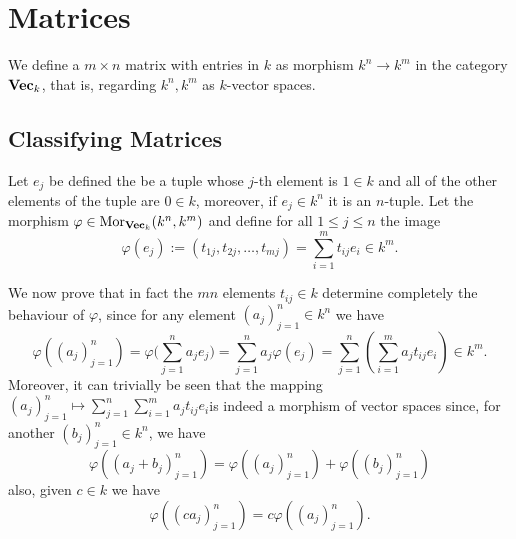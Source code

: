 \section{Matrices}

\begin{definition}[Matrix]
   We define a \(m \times n\) matrix with entries in \(k\) as morphism \(k^n \to
   k^m\) in the category \({\textbf{Vec}}_k\), that is, regarding \(k^n, k^m\) as
   \(k\)-vector spaces.
\end{definition}

\subsection{Classifying Matrices}

Let \(e_j\) be defined the be a tuple whose \(j\)-th element is \(1 \in k\) and
all of the other elements of the tuple are \(0 \in k\), moreover, if \(e_j \in
k^n\) it is an \(n\)-tuple. Let the morphism \(\varphi \in \operatorname{Mor}_{{\textbf{Vec}}_k}
(k^n, k^m)\) and define for all \(1 \leq j \leq n\) the image
\[
   \varphi(e_j) := (t_{1 j}, t_{2 j}, \dots, t_{mj}) = \sum_{i = 1}^m t_{ij} e_i
   \in k^m.
\]

We now prove that in fact the \(mn\) elements \(t_{ij} \in k\) determine
completely the behaviour of \(\varphi\), since for any element \((a_j)_{j=1}^n
\in k^n\) we have
\[
   \varphi((a_j)_{j=1}^n) = \varphi \Bigg( \sum_{j=1}^n a_j e_j \Bigg) =
   \sum_{j=1}^n a_j \varphi(e_j) = \sum_{j=1}^n \left( \sum_{i=1}^m a_j t_{i j}
   e_i\right) \in k^m.
\]
Moreover, it can trivially be seen that the mapping \((a_j)_{j=1}^n \mapsto
\sum_{j=1}^n \sum_{i=1}^m a_j t_{ij} e_i\)is indeed a morphism of vector
spaces since, for another \((b_j)_{j=1}^n \in k^n\), we have
\[
   \varphi((a_j + b_j)_{j=1}^n) = \varphi((a_j)_{j=1}^n) +
   \varphi((b_j)_{j=1}^n)
\]
also, given \(c \in k\) we have
\[
   \varphi((c a_j)_{j=1}^n) = c\varphi((a_j)_{j=1}^n).
\]

